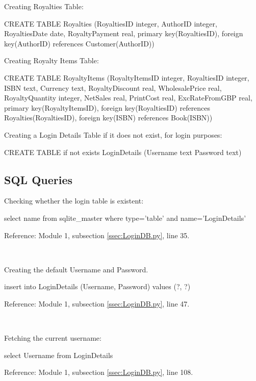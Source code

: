 Creating Royalties Table:
\begin{sql}
CREATE TABLE Royalties
                 (RoyaltiesID integer,
                 AuthorID integer,
                 RoyaltiesDate date,
                 RoyaltyPayment real,
                 primary key(RoyaltiesID),
                 foreign key(AuthorID) references Customer(AuthorID))
\end{sql}

Creating Royalty Items Table:
\begin{sql}
CREATE TABLE RoyaltyItems
                 (RoyaltyItemsID integer,
                 RoyaltiesID integer,
                 ISBN text,
                 Currency text,
                 RoyaltyDiscount real,
                 WholesalePrice real,
                 RoyaltyQuantity integer,
                 NetSales real,
                 PrintCost real,
                 ExcRateFromGBP real,
                 primary key(RoyaltyItemsID),
                 foreign key(RoyaltiesID) references Royalties(RoyaltiesID),
                 foreign key(ISBN) references Book(ISBN))
\end{sql}

Creating a Login Details Table if it does not exist, for login purposes:
\begin{sql}
CREATE TABLE if not exists LoginDetails
                 (Username text
                 Password text)
\end{sql}

\subsection{SQL Queries}

Checking whether the login table is existent:
\begin{sql}
select name
from sqlite_master
where type='table' and name='LoginDetails'
\end{sql}
Reference: Module 1,  subsection \ref{ssec:LoginDB.py}, line 35.

\

Creating the default Username and Password.
\begin{sql}
insert into LoginDetails (Username, Password)
values (?, ?)
\end{sql}
Reference: Module 1,  subsection \ref{ssec:LoginDB.py}, line 47.

\

Fetching the current username:
\begin{sql}
select Username
from LoginDetails
\end{sql}
Reference: Module 1,  subsection \ref{ssec:LoginDB.py}, line 108.

